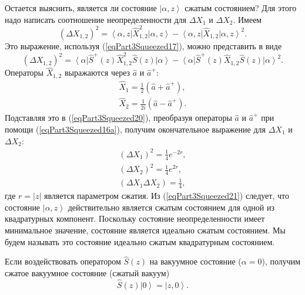 Остается выяснить, является ли состояние $\left|\alpha, z\right>$
сжатым состоянием? Для этого надо написать соотношение
неопределенности для $\Delta X_1$  и $\Delta X_2$. Имеем
\begin{equation}
\left(\Delta X_{1,2}\right)^2 = 
\left<\alpha, z\right| \hat{X}_{1,2}^2\left|\alpha, z\right> -
\left<\alpha, z\right| \hat{X}_{1,2}\left|\alpha, z\right>^2.
\nonumber
\end{equation}
Это выражение, используя (\ref{eqPart3Squeezed17}), можно представить в
виде 
\begin{equation}
\left(\Delta X_{1,2}\right)^2 = 
\left<\alpha\right|\hat{S}^{+}\left(z\right) \hat{X}_{1,2}^2\hat{S}\left(z\right)\left|\alpha\right> -
\left<\alpha\right|\hat{S}^{+}\left(z\right) \hat{X}_{1,2}\hat{S}\left(z\right)\left|\alpha\right>^2.
\label{eqPart3Squeezed20}
\end{equation}
Операторы $\hat{X}_{1,2}$ выражаются через $\hat{a}$ и $\hat{a}^{+}$:
\begin{eqnarray}
\hat{X}_1 = \frac{1}{2}\left(\hat{a} + \hat{a}^{+}\right), 
\nonumber \\
\hat{X}_2 = \frac{1}{2 i}\left(\hat{a} - \hat{a}^{+}\right).
\nonumber
\end{eqnarray}
Подставляя это в (\ref{eqPart3Squeezed20}), преобразуя операторы
$\hat{a}$ и $\hat{a}^{+}$ при помощи (\ref{eqPart3Squeezed16a}),
получим окончательное выражение для $\Delta X_1$  и $\Delta X_2$:
\begin{eqnarray}
\left(\Delta X_1\right)^2 = \frac{1}{4}e^{-2 r},
\nonumber \\
\left(\Delta X_2\right)^2 = \frac{1}{4}e^{2 r},
\nonumber \\
\left(\Delta X_1 \Delta X_2\right) = \frac{1}{4},
\label{eqPart3Squeezed21}
\end{eqnarray}
где $r = \left|z\right|$ является параметром сжатия. Из
(\ref{eqPart3Squeezed21}) следует, что состояние $\left|\alpha,
z\right>$ действительно является сжатым состоянием для одной из
квадратурных компонент. Поскольку состояние неопределенности имеет
минимальное значение, состояние является идеально сжатым
состоянием. Мы будем называть это состояние идеально сжатым
квадратурным состоянием.

Если воздействовать оператором $\hat{S}\left(z\right)$ на вакуумное
состояние ($\alpha = 0$), получим сжатое вакуумное состояние (сжатый
вакуум)
\begin{equation}
\hat{S}\left(z\right)\left|0\right> = \left|z, 0\right>.
\nonumber
\end{equation}

